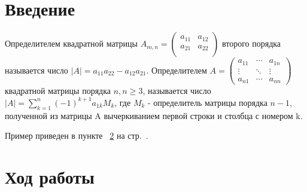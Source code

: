 \documentclass[12pt,a4paper]{scrartcl}
\begin{document}
\section{Введение}
\label{sec:intro}

Определителем квадратной матрицы
$ A_{m,n} = 
 \begin{pmatrix}
  a_{11} & a_{12} \\
  a_{21} & a_{22} \\
 \end{pmatrix}
$ второго порядка называется число 
$|A|= {a_{11} a_{22}-a_{12} a_{21}}$.
Определителем 
$ A = 
 \begin{pmatrix}
  a_{11} & \cdots & a_{1n} \\
  \vdots  & \ddots & \vdots  \\
  a_{n1}  & \cdots & a_{nn} 
 \end{pmatrix}
$ квадратной матрицы порядка $n, n\geq3$, называется число $|A|=\displaystyle \sum_{k=1}^n(-1)^{k+1}a_{1k}M_k$, где $M_k$ - определитель матрицы порядка $n-1$, полученной из матрицы A вычеркиванием первой строки и столбца с номером k.

Пример приведен в пункте ~\ref{sec:exp} на стр.~\pageref{sec:example}.

\section{Ход работы}
\label{sec:exp}
\end{document}
